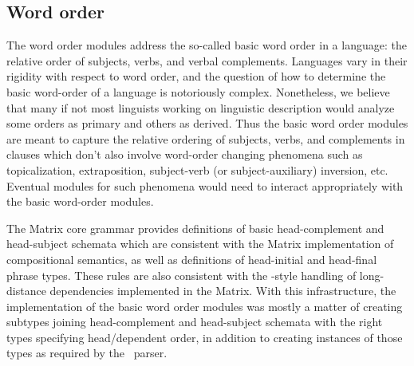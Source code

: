 \subsection{Word order}

The word order modules address the so-called basic word order in
a language: the relative order of subjects, verbs, and verbal complements.
Languages vary in their rigidity with respect to word order, and the
question of how to determine the basic word-order of a language is 
notoriously complex.  Nonetheless, we believe that many if not most
linguists working on linguistic description would analyze some orders
as primary and others as derived.  Thus the basic word order modules
are meant to capture the relative ordering of subjects, verbs, and complements
in clauses which don't also involve word-order changing phenomena
such as topicalization, extraposition, subject-verb (or subject-auxiliary)
inversion, etc.  Eventual modules for such phenomena would need to
interact appropriately with the basic word-order modules.

The Matrix core grammar provides definitions of basic
head-complement and head-subject schemata which are consistent with
the Matrix implementation of compositional semantics,
as well as definitions of head-initial and
head-final phrase types.  These rules are also consistent with the
{\hpsg}-style handling of long-distance dependencies implemented in the
Matrix.
With this infrastructure, the implementation of the basic
word order modules was mostly a matter of creating subtypes joining
head-complement and head-subject schemata with the right types
specifying head/dependent order, in addition to creating instances of
those types as required by the \lkb\ parser.


